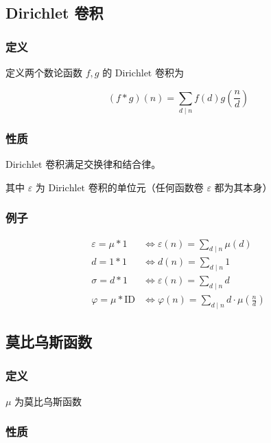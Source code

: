 \hr

\subsection{Dirichlet 卷积}

\subsubsection{定义}

定义两个数论函数 $f,g$ 的 $\text{Dirichlet}$ 卷积为

$$
(f*g)(n)=\sum_{d\mid n}f(d)g(\frac{n}{d})
$$

\subsubsection{性质}

$\text{Dirichlet}$ 卷积满足交换律和结合律。

其中 $\varepsilon$ 为 $\text{Dirichlet}$ 卷积的单位元（任何函数卷 $\varepsilon$ 都为其本身）

\subsubsection{例子}

$$
\begin{aligned}
\varepsilon=\mu*1&\Leftrightarrow\varepsilon(n)=\sum_{d\mid n}\mu(d)\\
d=1*1&\Leftrightarrow d(n)=\sum_{d\mid n}1\\
\sigma=d*1&\Leftrightarrow\varepsilon(n)=\sum_{d\mid n}d\\
\varphi=\mu*\text{ID}&\Leftrightarrow\varphi(n)=\sum_{d\mid n}d\cdot\mu(\frac{n}{d})
\end{aligned}
$$

\hr

\subsection{莫比乌斯函数}

\subsubsection{定义}

$\mu$ 为莫比乌斯函数

\subsubsection{性质}

